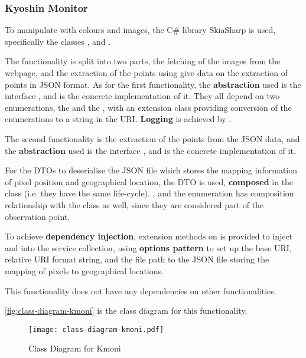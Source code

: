 \subsubsection{Kyoshin Monitor}

To manipulate with colours and images, the C\# library SkiaSharp is used, specifically the classes ,  and .

The functionality is split into two parts, the fetching of the images from the webpage, and the extraction of the points using give data on the extraction of points in JSON format. As for the first functionality, the \textbf{abstraction} used is the interface , and  is the concrete implementation of it. They all depend on two enumerations, the  and the , with an extension class providing conversion of the enumerations to a string in the URI. \textbf{Logging} is achieved by .

The second functionality is the extraction of the points from the JSON data, and the \textbf{abstraction} used is the interface , and  is the concrete implementation of it.

For the DTOs to deserialise the JSON file which stores the mapping information of pixel position and geographical location, the DTO  is used, \textbf{composed} in the class  (i.e. they have the same life-cycle). ,  and the enumeration  has composition relationship with the  class as well, since they are considered part of the observation point.

To achieve \textbf{dependency injection}, extension methods on  is provided to inject  and  into the service collection, using \textbf{options pattern} to set up the base URI, relative URI format string, and the file path to the JSON file storing the mapping of pixels to geographical locations.

This functionality does not have any dependencies on other functionalities.

\autoref{fig:class-diagram-kmoni} is the class diagram for this functionality.

\begin{figure}[htp]
    \centering
    \texttt{[image: class-diagram-kmoni.pdf]}
    \caption{Class Diagram for Kmoni}
    \label{fig:class-diagram-kmoni}
\end{figure}

